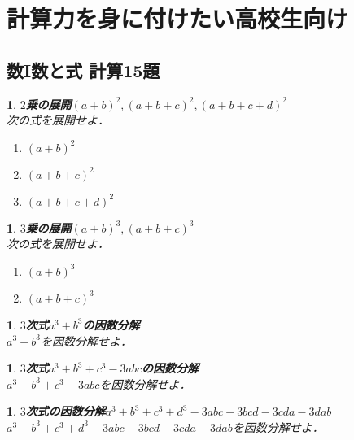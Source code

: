 \documentclass[10pt,
fleqn,
dvipdfmx,
uplatex
]{jsarticle}
\newtheorem{question}[Question]{}
\begin{document}
\section{計算力を身に付けたい高校生向け}

\subsection{数I数と式 計算15題}



\begin{question}{\bf\boldmath $2$乗の展開$\left(a+b\right)^2,\left(a+b+c\right)^2,\left(a+b+c+d\right)^2$}\\
次の式を展開せよ．
\begin{enumerate}
\item $\left(a+b\right)^2$
\item $\left(a+b+c\right)^2$
\item $\left(a+b+c+d\right)^2$
\end{enumerate}

\end{question}



\begin{question}{\bf\boldmath $3$乗の展開$\left(a+b\right)^3,\left(a+b+c\right)^3$}\\
次の式を展開せよ．
\begin{enumerate}
\item $\left(a+b\right)^3$
\item $\left(a+b+c\right)^3$
\end{enumerate}

\end{question}



\begin{question}{\bf\boldmath $3$次式$a^3+b^3$の因数分解}\\
$a^3+b^3$を因数分解せよ．
\end{question}



\begin{question}{\bf\boldmath $3$次式$a^3+b^3+c^3-3abc$の因数分解}\\
$a^3+b^3+c^3-3abc$を因数分解せよ．
\end{question}



\begin{question}{\bf\boldmath $3$次式の因数分解$a^3+b^3+c^3+d^3-3abc-3bcd-3cda-3dab$}\\
$a^3+b^3+c^3+d^3-3abc-3bcd-3cda-3dab$を因数分解せよ．
\end{question}
\end{document}

